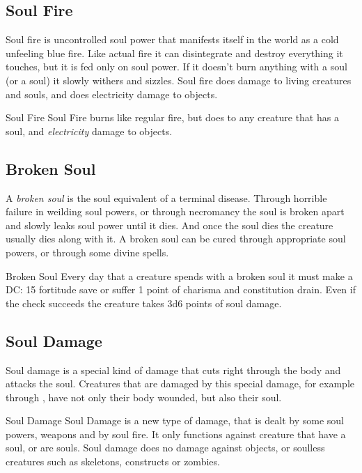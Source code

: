\subsection{Soul Fire}
\label{sec:Soul Fire}

Soul fire is uncontrolled soul power that manifests itself in the world as a
cold unfeeling blue fire. Like actual fire it can disintegrate and destroy
everything it touches, but it is fed only on soul power. If it doesn't burn
anything with a soul (or a soul) it slowly withers and sizzles. Soul fire does
damage to living creatures and souls, and does electricity damage to objects.

\begin{35e}{Soul Fire}
  Soul Fire burns like regular fire, but does  to any
  creature that has a soul, and \emph{electricity} damage to objects.
\end{35e}

\subsection{Broken Soul}
\label{sec:Broken Soul}

A \emph{broken soul} is the soul equivalent of a terminal disease. Through
horrible failure in weilding soul powers, or through necromancy the soul is
broken apart and slowly leaks soul power until it dies. And once the soul dies
the creature usually dies along with it. A broken soul can be cured through
appropriate soul powers, or through some divine spells.

\begin{35e}{Broken Soul}
  Every day that a creature spends with a broken soul it must make a DC: 15
  fortitude save or suffer 1 point of charisma and constitution drain. Even if
  the check succeeds the creature takes 3d6 points of soul damage.
\end{35e}

\subsection{Soul Damage}
\label{sec:Soul Damage}

Soul damage is a special kind of damage that cuts right through the body and
attacks the soul. Creatures that are damaged by this special damage, for
example through , have not only their body wounded,
but also their soul.

\begin{35e}{Soul Damage}
  Soul Damage is a new type of damage, that is dealt by some soul powers,
  weapons and by soul fire. It only functions against creature that have a
  soul, or are souls. Soul damage does no damage against objects, or soulless
  creatures such as skeletons, constructs or zombies.
\end{35e}

